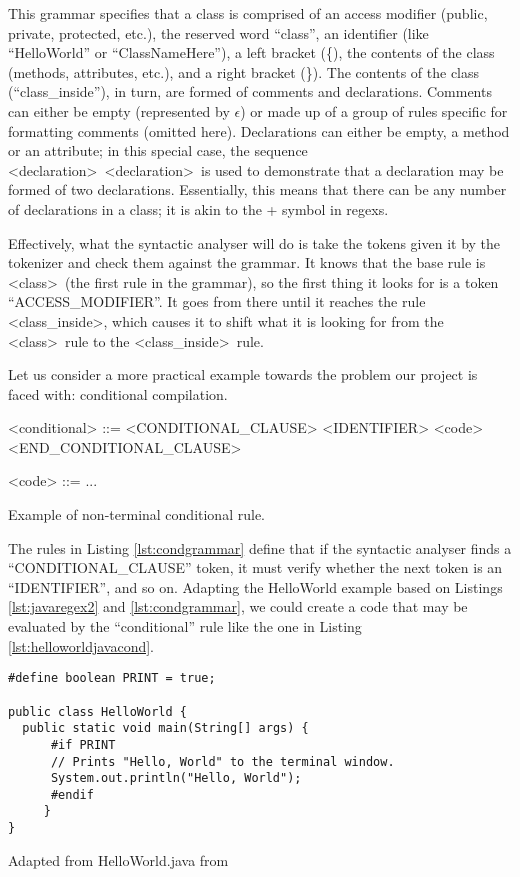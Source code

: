 This \gls{grammar} specifies that a class is comprised of an access modifier (public, private, protected, etc.), the reserved word ``class'', an identifier (like ``HelloWorld'' or ``ClassNameHere''), a left bracket (\{), the contents of the class (methods, attributes, etc.), and a right bracket (\}). The contents of the class (``class_inside''), in turn, are formed of comments and declarations. Comments can either be empty (represented by $\epsilon$) or made up of a group of rules specific for formatting comments (omitted here). Declarations can either be empty, a method or an attribute; in this special case, the sequence \textless declaration\textgreater \ \textless declaration\textgreater \ is used to demonstrate that a declaration may be formed of two declarations. Essentially, this means that there can be any number of declarations in a class; it is akin to the + symbol in \gls{regex}s.

Effectively, what the syntactic analyser will do is take the tokens given it by the tokenizer and check them against the \gls{grammar}. It knows that the base rule is \textless class\textgreater \ (the first rule in the grammar), so the first thing it looks for is a token ``ACCESS_MODIFIER''. It goes from there until it reaches the rule \textless class_inside\textgreater , which causes it to shift what it is looking for from the \textless class\textgreater \ rule to the \textless class_inside\textgreater \ rule.

Let us consider a more practical example towards the problem our project is faced with: conditional compilation.

\begin{listing}
\begin{grammar}
<conditional> ::= <CONDITIONAL_CLAUSE> <IDENTIFIER> <code> <END_CONDITIONAL_CLAUSE>

<code> ::= ...
\end{grammar}
\caption{Example of non-terminal conditional rule.} \label{lst:condgrammar}
\end{listing}

The rules in Listing \ref{lst:condgrammar} define that if the syntactic analyser finds a ``CONDITIONAL_CLAUSE'' token, it must verify whether the next token is an ``IDENTIFIER'', and so on. Adapting the HelloWorld example based on Listings \ref{lst:javaregex2} and \ref{lst:condgrammar}, we could create a code that may be evaluated by the ``conditional'' rule like the one in Listing \ref{lst:helloworldjavacond}.

\begin{listing}
\begin{verbatim}
#define boolean PRINT = true;

public class HelloWorld {
  public static void main(String[] args) {
      #if PRINT
      // Prints "Hello, World" to the terminal window.
      System.out.println("Hello, World");
      #endif
     }
}
\end{verbatim}
\caption{Adapted from HelloWorld.java from \cite{SEDGEWICK:2011}} \label{lst:helloworldjavacond}
\end{listing}

